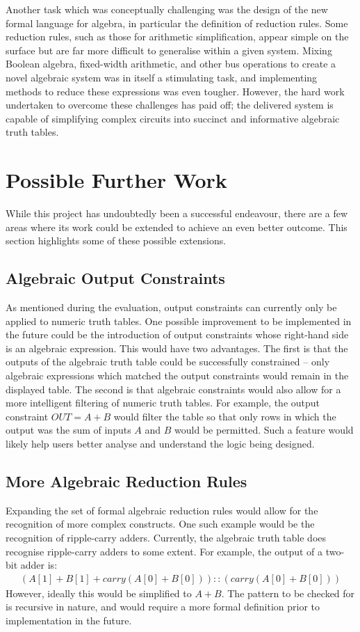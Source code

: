 Another task which was conceptually challenging was the design of the new formal language for algebra, in particular the definition of reduction rules. Some reduction rules, such as those for arithmetic simplification, appear simple on the surface but are far more difficult to generalise within a given system. Mixing Boolean algebra, fixed-width arithmetic, and other bus operations to create a novel algebraic system was in itself a stimulating task, and implementing methods to reduce these expressions was even tougher. However, the hard work undertaken to overcome these challenges has paid off; the delivered system is capable of simplifying complex circuits into succinct and informative algebraic truth tables.

\section{Possible Further Work}
While this project has undoubtedly been a successful endeavour, there are a few areas where its work could be extended to achieve an even better outcome. This section highlights some of these possible extensions.
\subsection{Algebraic Output Constraints} \label{subsec:algoutputcons}
As mentioned during the evaluation, output constraints can currently only be applied to numeric truth tables. One possible improvement to be implemented in the future could be the introduction of output constraints whose right-hand side is an algebraic expression. This would have two advantages. The first is that the outputs of the algebraic truth table could be successfully constrained -- only algebraic expressions which matched the output constraints would remain in the displayed table. The second is that algebraic constraints would also allow for a more intelligent filtering of numeric truth tables. For example, the output constraint $OUT = A + B$ would filter the table so that only rows in which the output was the sum of inputs $A$ and $B$ would be permitted. Such a feature would likely help users better analyse and understand the logic being designed.
\subsection{More Algebraic Reduction Rules}
Expanding the set of formal algebraic reduction rules would allow for the recognition of more complex constructs. One such example would be the recognition of ripple-carry adders. Currently, the algebraic truth table does recognise ripple-carry adders to some extent. For example, the output of a two-bit adder is:
\begin{align*}
    (A[1] + B[1] + carry(A[0] + B[0]))::(carry(A[0] + B[0]))
\end{align*}
However, ideally this would be simplified to $A + B$. The pattern to be checked for is recursive in nature, and would require a more formal definition prior to implementation in the future.
